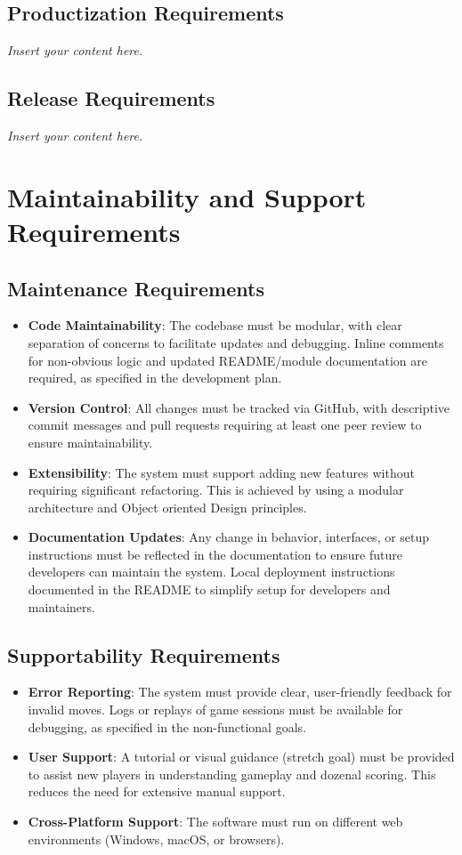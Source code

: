 \documentclass[12pt]{article}
\newcommand{\lips}{\textit{Insert your content here.}}
\begin{document}
\subsection{Productization Requirements}
\lips
\subsection{Release Requirements}
\lips

\section{Maintainability and Support Requirements}
\subsection{Maintenance Requirements}

\begin{itemize}
    \item \textbf{Code Maintainability}: The codebase must be modular, with clear separation of concerns to facilitate updates and debugging. Inline comments for non-obvious logic and updated README/module documentation are required, as specified in the development plan.
    \item \textbf{Version Control}: All changes must be tracked via GitHub, with descriptive commit messages and pull requests requiring at least one peer review to ensure maintainability.
    \item \textbf{Extensibility}: The system must support adding new features without requiring significant refactoring. This is achieved by using a modular architecture and Object oriented Design principles.
    \item \textbf{Documentation Updates}: Any change in behavior, interfaces, or setup instructions must be reflected in the documentation to ensure future developers can maintain the system. Local deployment instructions documented in the README to simplify setup for developers and maintainers.
\end{itemize}

\subsection{Supportability Requirements}

\begin{itemize}
    \item \textbf{Error Reporting}: The system must provide clear, user-friendly feedback for invalid moves. Logs or replays of game sessions must be available for debugging, as specified in the non-functional goals.
    \item \textbf{User Support}: A tutorial or visual guidance (stretch goal) must be provided to assist new players in understanding gameplay and dozenal scoring. This reduces the need for extensive manual support.
    \item \textbf{Cross-Platform Support}: The software must run on different web environments (Windows, macOS, or browsers). 
\end{itemize}
\end{document}
